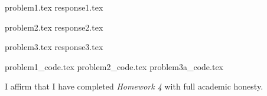 \documentclass[letterpaper, 12pt]{article}
\begin{document}

{problem1.tex}
{response1.tex}

{problem2.tex}
{response2.tex}

% 
{problem3.tex}
{response3.tex}

\appendix

{problem1_code.tex}
{problem2_code.tex}
{problem3a_code.tex}

\par

I affirm that I have completed \textit{Homework 4} with full academic honesty.
\end{document}
